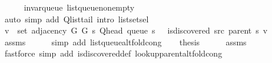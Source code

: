 \begin{isabellebody}
\ \ \ \ \isamarkupfalse%
\ invar{\isacharunderscore}{\kern0pt}queue\ list{\isacharunderscore}{\kern0pt}queue{\isacharunderscore}{\kern0pt}non{\isacharunderscore}{\kern0pt}empty\isanewline
\ \ \ \ \isamarkupfalse%
\ {\isacharparenleft}{\kern0pt}auto\ simp\ add{\isacharcolon}{\kern0pt}\ Q{\isachardot}{\kern0pt}list{\isacharunderscore}{\kern0pt}tail\ intro{\isacharcolon}{\kern0pt}\ list{\isachardot}{\kern0pt}set{\isacharunderscore}{\kern0pt}sel{\isacharparenleft}{\kern0pt}{}{\isacharparenright}{\kern0pt}{\isacharparenright}{\kern0pt}\isanewline
\ \ \isamarkupfalse%
\ {\isachardoublequoteopen}v\ {\isasymin}\ set\ {\isacharparenleft}{\kern0pt}adjacency\ G{}\ G{}\ s\ {\isacharparenleft}{\kern0pt}Q{\isacharunderscore}{\kern0pt}head\ {\isacharparenleft}{\kern0pt}queue\ s{\isacharparenright}{\kern0pt}{\isacharparenright}{\kern0pt}{\isacharparenright}{\kern0pt}\ {\isasymand}\ {\isasymnot}\ is{\isacharunderscore}{\kern0pt}discovered\ src\ {\isacharparenleft}{\kern0pt}parent\ s{\isacharparenright}{\kern0pt}\ v{\isachardoublequoteclose}\isanewline
\ \ \ \ \isamarkupfalse%
\ assms\isanewline
\ \ \ \ \isamarkupfalse%
\ {\isacharparenleft}{\kern0pt}simp\ add{\isacharcolon}{\kern0pt}\ list{\isacharunderscore}{\kern0pt}queue{\isacharunderscore}{\kern0pt}alt{\isacharunderscore}{\kern0pt}fold{\isacharunderscore}{\kern0pt}cong{\isacharparenright}{\kern0pt}\isanewline
\ \ \isamarkupfalse%
\ {\isacharquery}{\kern0pt}thesis\isanewline
\ \ \ \ \isamarkupfalse%
\ assms\isanewline
\ \ \ \ \isamarkupfalse%
\ {\isacharparenleft}{\kern0pt}fastforce\ simp\ add{\isacharcolon}{\kern0pt}\ is{\isacharunderscore}{\kern0pt}discovered{\isacharunderscore}{\kern0pt}def\ lookup{\isacharunderscore}{\kern0pt}parent{\isacharunderscore}{\kern0pt}alt{\isacharunderscore}{\kern0pt}fold{\isacharunderscore}{\kern0pt}cong{\isacharparenright}{\kern0pt}\isanewline
{}\isamarkupfalse%
%
\endisatagproof
{\isafoldproof}%
%
\isadelimproof
%
\endisadelimproof
%
\isadelimdocument
%
\endisadelimdocument
%
\isatagdocument
%

\end{isabellebody}
